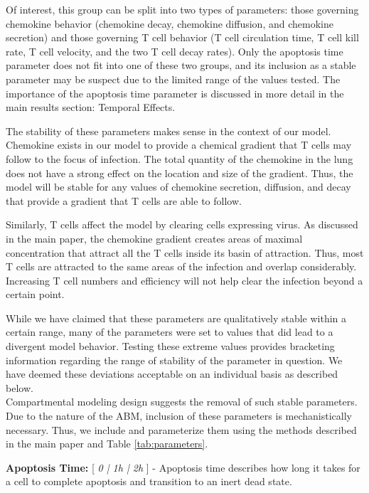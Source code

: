 \documentclass[preprint,10pt,authoryear]{article}
\begin{document}
Of interest, this group can be split into two types of parameters: those governing chemokine behavior (chemokine decay, chemokine diffusion, and chemokine secretion) and those governing T cell behavior (T cell circulation time, T cell kill rate, T cell velocity, and the two T cell decay rates).  Only the apoptosis time parameter does not fit into one of these two groups, and its inclusion as a stable parameter may be suspect due to the limited range of the values tested.  The importance of the apoptosis time parameter is discussed in more detail in the main results section: Temporal Effects.  

The stability of these parameters makes sense in the context of our model.  Chemokine exists in our model to provide a chemical gradient that T cells may follow to the focus of infection.  The total quantity of the chemokine in the lung does not have a strong effect on the location and size of the gradient.  Thus, the model will be stable for any values of chemokine secretion, diffusion, and decay that provide a gradient that T cells are able to follow.

Similarly, T cells affect the model by clearing cells expressing virus.  As discussed in the main paper, the chemokine gradient creates areas of maximal concentration that attract all the T cells inside its basin of attraction.  Thus, most T cells are attracted to the same areas of the infection and overlap considerably.  Increasing T cell numbers and efficiency will not help clear the infection beyond a certain point.

While we have claimed that these parameters are qualitatively stable within a certain range, many of the parameters were set to values that did lead to a divergent model behavior.  Testing these extreme values provides bracketing information regarding the range of stability of the parameter in question.  We have deemed these deviations acceptable on an individual basis as described below. \\

Compartmental modeling design suggests the removal of such stable parameters.  Due to the nature of the ABM, inclusion of these parameters is mechanistically necessary.  Thus, we include and parameterize them using the methods described in the main paper and Table \ref{tab:parameters}.

\textbf{Apoptosis Time:} [ \textit{0 | 1h | 2h} ] - Apoptosis time describes how long it takes for a cell to complete apoptosis and transition to an inert dead state.  
\end{document}

